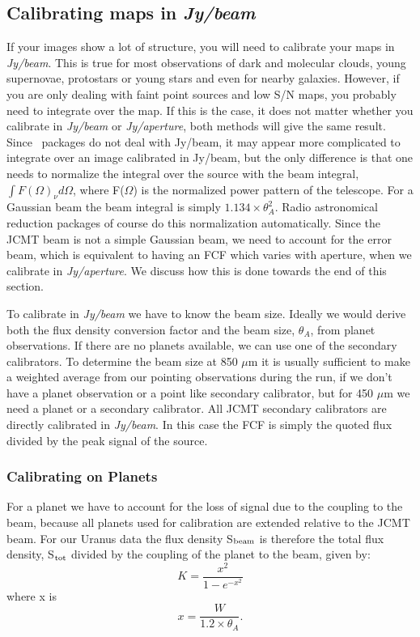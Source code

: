 \documentclass[twoside,11pt,noabs]{starlink}
\providecommand{\starlink}{\htmladdnormallink{Starlink}{http://www.starlink.ac.uk/}}
\begin{document}
\subsection{ Calibrating maps in \textit{Jy/beam}
\label{beam}}

If your images show a lot of structure, you will need to calibrate
your maps in \textit{Jy/beam}.  This is true for most observations of
dark and molecular clouds, young supernovae, protostars or young stars
and even for nearby galaxies.  However, if you are only dealing with
faint point sources and low S/N maps, you probably need to integrate
over the map.  If this is the case, it does not matter whether you
calibrate in \textit{Jy/beam} or \textit{Jy/aperture}, both methods will
give the same result.  Since \starlink\ packages do not deal with
Jy/beam, it may appear more complicated to integrate over an image
calibrated in Jy/beam, but the only difference is that one needs to
normalize the integral over the source with the beam integral, $\int
F(\Omega)_\nu d\Omega$, where F($\Omega$) is the normalized power
pattern of the telescope.  For a Gaussian beam the beam integral is
simply $ 1.134 \times \theta_A^2$.  Radio astronomical reduction
packages of course do this normalization automatically.  Since the
JCMT beam is not a simple Gaussian beam, we need to account for the
error beam, which is equivalent to having an FCF which varies with
aperture, when we calibrate in \textit{Jy/aperture}.  We discuss how this
is done towards the end of this section.

To calibrate in \textit{Jy/beam} we have to know the beam size.  Ideally
we would derive both the flux density conversion factor and the beam
size, $\theta_A$, from planet observations. If there are no planets
available, we can use one of the secondary calibrators. To determine
the beam size at 850 $\mu$m it is usually sufficient to make a weighted
average from our pointing observations during the run, if we don't have
a planet observation or a point like secondary calibrator, but for 450
$\mu$m we need a planet or a secondary calibrator.  All JCMT secondary
calibrators are directly calibrated in \textit{Jy/beam}. In this case the
FCF is simply the quoted flux divided by the peak signal of the
source.

\subsubsection{Calibrating on Planets}

For a planet we have to account for the loss of signal due to the
coupling to the beam, because all planets used for calibration are
extended relative to the JCMT beam. For our Uranus data the flux
density S$_{\rm beam}$ is therefore the total flux density, S$_{\rm
tot}$ divided by the coupling of the planet to the beam, given by:
\begin{equation} K = \frac{x^2}{1 - e^{-x^2}} \end{equation} where x
is
\begin{equation} x = \frac{W}{1.2 \times \theta_A}.  \end{equation}
\end{document}
